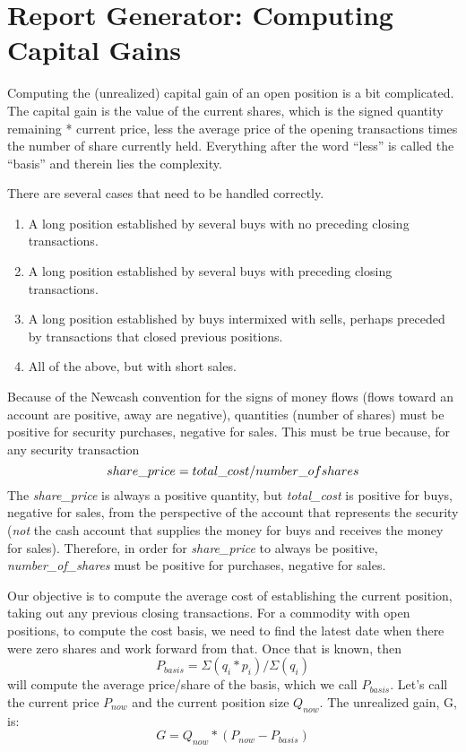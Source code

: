 \documentclass{report}
\begin{document}
\chapter{Report Generator: Computing Capital Gains}
Computing the (unrealized) capital gain of an open position is a bit complicated. The capital gain is the value of the current shares,
which is the signed quantity remaining * current price, less the average price of the opening transactions times the number of share currently held. Everything after the word ``less'' is called the ``basis'' and therein lies the complexity.

There are several cases that need to be handled correctly.
\begin{enumerate}
\item A long position established by several buys with no preceding closing transactions.
\item A long position established by several buys with preceding closing transactions.
\item A long position established by buys intermixed with sells, perhaps preceded by transactions that closed previous positions.
\item All of the above, but with short sales.
\end{enumerate}
Because of the Newcash convention for the signs of money flows (flows toward an account are positive, away are negative), quantities (number of shares) must be positive for security purchases, negative for sales.
This must be true because, for any security transaction
\[share\_price = total\_cost / number\_of\-shares\]
The \emph{share\_price} is always a positive quantity, but \emph{total\_cost} is positive for buys, negative for sales, from the perspective of the account that represents the security (\emph{not} the cash account that supplies the money for buys and receives the money for sales). Therefore, in order for \emph{share\_price} to always be positive, \emph{number\_of\_shares} must be positive for purchases, negative for sales.

Our objective is to compute the average cost of establishing the current position, taking out any previous closing transactions.
For a commodity with open positions, to compute the cost basis, we need to find the latest date when there were zero shares and work forward from that.
Once that is known, then 
\[P_{basis}=\Sigma(q_i*p_i)/\Sigma(q_i)\]
will compute the average price/share of the basis, which we call $P_{basis}$. Let's call the current price $P_{now}$ and the current position size $Q_{now}$.  The unrealized gain, G, is:
\[G = Q_{now} * (P_{now}-P_{basis})\]
\end{document}
